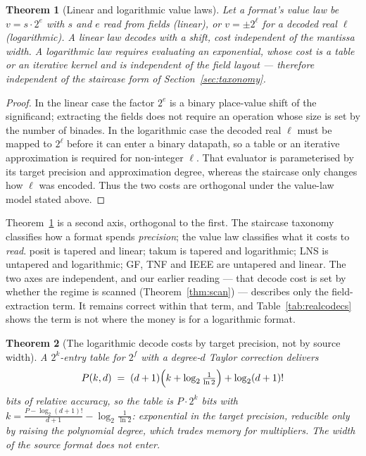 \documentclass[11pt]{article}
\newtheorem{theorem}{Theorem}
\theoremstyle{definition}
\begin{document}
\begin{theorem}[Linear and logarithmic value laws]
\label{thm:valuelaw}
Let a format's value law be $v = s \cdot 2^{e}$ with $s$ and $e$ read from fields
(\emph{linear}), or $v = \pm 2^{\ell}$ for a decoded real $\ell$
(\emph{logarithmic}). A linear law decodes with a shift, cost independent of the
mantissa width. A logarithmic law requires evaluating an exponential, whose cost
is a table or an iterative kernel and is independent of the field layout ---
therefore independent of the staircase form of Section~\ref{sec:taxonomy}.
\end{theorem}
\begin{proof}
In the linear case the factor $2^e$ is a binary place-value shift of the
significand; extracting the fields does not require an operation whose size is
set by the number of binades.  In the logarithmic case the decoded real
$\ell$ must be mapped to $2^\ell$ before it can enter a binary datapath, so a
table or an iterative approximation is required for non-integer $\ell$.
That evaluator is parameterised by its target precision and approximation
degree, whereas the staircase only changes how $\ell$ was encoded.  Thus the
two costs are orthogonal under the value-law model stated above.
\end{proof}

Theorem~\ref{thm:valuelaw} is a second axis, orthogonal to the first. The
staircase taxonomy classifies how a format spends \emph{precision}; the value law
classifies what it costs to \emph{read}. posit is tapered and linear; takum is
tapered and logarithmic; LNS is untapered and logarithmic; GF, TNF and IEEE are
untapered and linear. The two axes are independent, and our earlier reading ---
that decode cost is set by whether the regime is scanned
(Theorem~\ref{thm:scan}) --- describes only the field-extraction term. It remains
correct within that term, and Table~\ref{tab:realcodecs} shows the term is not
where the money is for a logarithmic format.


\begin{theorem}[The logarithmic decode costs by target precision, not by source width]
\label{thm:targetprec}
A $2^{k}$-entry table for $2^{f}$ with a degree-$d$ Taylor correction delivers
\[
P(k,d) \;=\; (d+1)\Bigl(k + \log_2\tfrac{1}{\ln 2}\Bigr) + \log_2 (d+1)!
\]
bits of relative accuracy, so the table is $P \cdot 2^{k}$ bits with
$k = \frac{P - \log_2 (d+1)!}{d+1} - \log_2\frac{1}{\ln 2}$: exponential in the
target precision, reducible only by raising the polynomial degree, which trades
memory for multipliers. The width of the source format does not enter.
\end{theorem}
\end{document}
